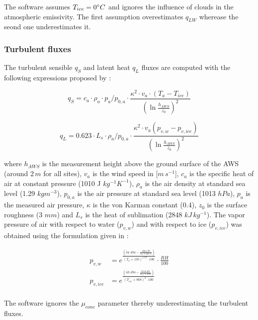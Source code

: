 \documentclass[utf8]{frontiersSCNS}
\begin{document}
The software assumes $T_{ice} = 0 \degree C$ and ignores the influence of clouds in the atmospheric emissivity.
The first assumption overestimates $q_{LW}$ wherease the seond one underestimates it.  

\subsubsection{Turbulent fluxes} \label{sec:Qs}

The turbulent sensible $q_{S}$ and latent heat $q_{L}$ fluxes are computed with the following expressions
proposed by \cite{Garratt_1992}:

\begin{equation}
	q_{S}= c_{a} \cdot \rho_{a} \cdot p_{a}/p_{0,a} \cdot \frac{\kappa^2 \cdot v_a \cdot
		(T_a-T_{ice})}{{(\ln{\frac{h_{AWS}}{z_{0}}})}^2}
	\label{eqn:qs}
\end{equation}

\begin{equation}
	q_{L}= 0.623 \cdot L_s \cdot \rho_{a}/p_{0,a} \cdot \frac{\kappa^2 \cdot
	v_a(p_{v,w}-p_{v,ice})}{{(\ln{\frac{h_{AWS}}{z_{0}}})}^2}
\end{equation}

where $h_{AWS}$ is the measurement height above the ground surface of the AWS (around $2\,m$ for all sites),
$v_a$ is the wind speed in [$m\,s^{-1}$], $c_a$ is the specific heat of air at constant pressure (1010 J
$kg^{-1} K^{-1}$), $\rho_{a}$ is the air density at standard sea level (1.29 $kg m^{-3}$), $p_{0,a}$ is the air
pressure at standard sea level (1013 $hPa$), $p_{a}$ is the measured air pressure, $\kappa$ is the von Karman
constant (0.4), $z_{0}$ is the surface roughness (3 $mm$) and $L_s$ is the heat of sublimation (2848
$kJ\,kg^{-1}$).  The vapor pressure of air with respect to water ($p_{v,w}$) and with respect to ice
($p_{v,ice}$) was obtained using the formulation given in \cite{huang_2018} :

\begin{equation}
	\begin{split}
		p_{v,w}&=e^{\frac{(34.494 - \frac{4924.99}{T_{a} + 237.1})}{(T_a + 105)^{1.57} \cdot 100}} \cdot \frac{RH}{100} \\
		p_{v,ice}&=e^{\frac{(43.494 - \frac{6545.89}{T_{ice} + 278})}{(T_{ice} + 868)^{2} \cdot 100}} \\
	\end{split} \label{eqn:vp}
\end{equation}

The software ignores the $\mu_{cone}$ parameter thereby underestimating the turbulent fluxes.
\end{document}
